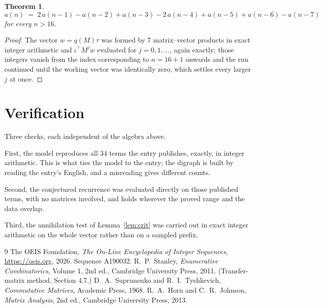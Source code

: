\documentclass[11pt,a4paper]{article}
\theoremstyle{plain}
\newtheorem{theorem}{Theorem}
\theoremstyle{definition}
\begin{document}
\begin{theorem}
\[
a(n)\;=\;2\,a(n-1) - a(n-2) + a(n-3) - 2\,a(n-4) + a(n-5) + a(n-6) - a(n-7)
\]
for every $n>16$.
\end{theorem}

\begin{proof}
The vector $w=q(M)\tau$ was formed by $7$ matrix--vector products in exact integer
arithmetic and $\iota^{\!\top}M^{j}w$ evaluated for $j=0,1,\dots$, again exactly; those
integers vanish from the index corresponding to $n=16+1$ onwards and the run continued
until the working vector was identically zero, which settles every larger $j$ at once.
\end{proof}

\section{Verification}

Three checks, each independent of the algebra above.

First, the model reproduces all $34$ terms the entry publishes, exactly, in integer
arithmetic. This is what ties the model to the entry: the digraph is built by reading the
entry's English, and a misreading gives different counts.

Second, the conjectured recurrence was evaluated directly on those published terms, with no
matrices involved, and holds wherever the proved range and the data overlap.

Third, the annihilation test of Lemma~\ref{lem:crit} was carried out in exact integer
arithmetic on the whole vector rather than on a sampled prefix.

\begin{thebibliography}{9}
 The OEIS Foundation, \emph{The On-Line Encyclopedia of Integer
Sequences}, \url{https://oeis.org}, 2026. Sequence A190032.
 R.~P.~Stanley, \emph{Enumerative Combinatorics}, Volume 1, 2nd ed.,
Cambridge University Press, 2011. (Transfer-matrix method, Section 4.7.)
 D.~A.~Suprunenko and R.~I.~Tyshkevich, \emph{Commutative Matrices},
Academic Press, 1968.
 R.~A.~Horn and C.~R.~Johnson, \emph{Matrix Analysis}, 2nd ed., Cambridge
University Press, 2013.
\end{thebibliography}
\end{document}
